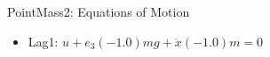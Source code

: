 PointMass2: Equations of Motion
\begin{itemize}
\item Lag1: $u+e_3 (-1.0) m g+\ddot{x} (-1.0) m = 0$
\end{itemize}